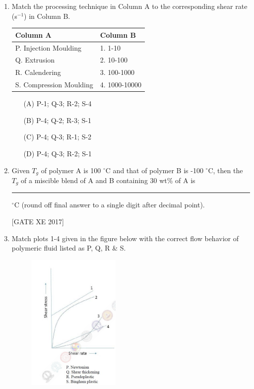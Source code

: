 \documentclass[journal,12pt,onecolumn]{IEEEtran}
\theoremstyle{remark}
\begin{document}
\begin{enumerate}
\hfill [GATE XE 2017] 

\item Match the processing technique in Column A to the corresponding shear rate (s$^{-1}$) in Column B.

\begin{tabular}{|l|l|}
\hline
\textbf{Column A} & \textbf{Column B} \\
\hline
P. Injection Moulding & 1. 1-10 \\
Q. Extrusion & 2. 10-100 \\
R. Calendering & 3. 100-1000 \\
S. Compression Moulding & 4. 1000-10000 \\
\hline
\end{tabular}

\begin{enumerate}
    \item[(A)] P-1; Q-3; R-2; S-4
    \item[(B)] P-4; Q-2; R-3; S-1
    \item[(C)] P-4; Q-3; R-1; S-2
    \item[(D)] P-4; Q-3; R-2; S-1
\end{enumerate}


\item Given $T_g$ of polymer A is 100 $^\circ$C and that of polymer B is -100 $^\circ$C, then the $T_g$ of a miscible blend of A and B containing 30 wt\% of A is \rule{2cm}{0.15mm} $^\circ$C (round off final answer to a single digit after decimal point).

\hfill [GATE XE 2017] 

\item Match plots 1-4 given in the figure below with the correct flow behavior of polymeric fluid listed as P, Q, R \& S.
\begin{figure}[H]
    \centering
    \includegraphics[width=0.5\linewidth]{figs/fig34.png}
    \caption{}
    \label{fig:placeholder}
\end{figure}


\end{enumerate}
\end{document}
